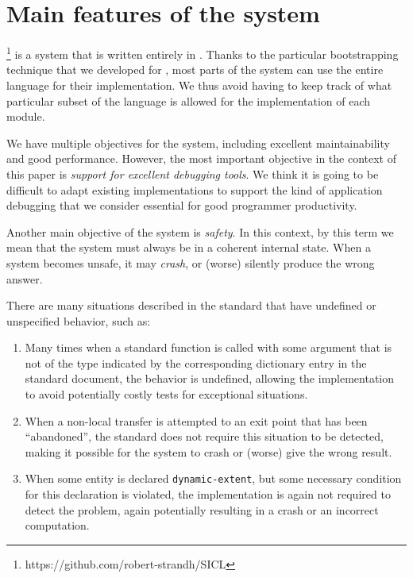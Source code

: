 \section{Main features of the \sicl{} system}
\label{sec-sicl-features}

\sicl{}%
\footnote{https://github.com/robert-strandh/SICL}
is a system that is written entirely in \commonlisp{}.  Thanks
to the particular bootstrapping technique
\cite{durand_irene_2019_2634314} that we developed for \sicl{}, most
parts of the system can use the entire language for their
implementation.  We thus avoid having to keep track of what particular
subset of the language is allowed for the implementation of each
module.

We have multiple objectives for the \sicl{} system, including
excellent maintainability and good performance.  However, the most
important objective in the context of this paper is \emph{support for
  excellent debugging tools}.  We think it is going to be difficult to
adapt existing \commonlisp{} implementations to support the kind of
application debugging that we consider essential for good programmer
productivity.

Another main objective of the \sicl{} system is \emph{safety}.  In
this context, by this term we mean that the system must always be in a
coherent internal state.  When a system becomes unsafe, it may
\emph{crash}, or (worse) silently produce the wrong answer.

There are many situations described in the \commonlisp{} standard that
have undefined or unspecified behavior, such as:

\begin{enumerate}
\item Many times when a standard function is called with some argument
  that is not of the type indicated by the corresponding dictionary
  entry in the \commonlisp{} standard document, the behavior is
  undefined, allowing the implementation to avoid potentially costly
  tests for exceptional situations.
\item When a non-local transfer is attempted to an exit point that has
  been ``abandoned'', the standard does not require this situation to
  be detected, making it possible for the system to crash or (worse)
  give the wrong result.
\item When some entity is declared \texttt{dynamic-extent}, but some
  necessary condition for this declaration is violated, the
  implementation is again not required to detect the problem, again
  potentially resulting in a crash or an incorrect computation.
\end{enumerate}


